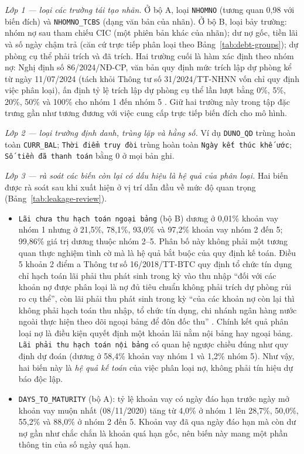 \noindent\textit{Lớp 1 --- loại các trường tái tạo nhãn.} Ở bộ A, loại \mbox{\texttt{NHOMNO}} (tương quan 0,98 với biến đích) và \mbox{\texttt{NHOMNO\_TCBS}} (dạng văn bản của nhãn). Ở bộ B, loại bảy trường: nhóm nợ sau tham chiếu CIC (một phiên bản khác của nhãn); dư nợ gốc, tiền lãi và số ngày chậm trả (căn cứ trực tiếp phân loại theo Bảng~\ref{tab:debt-groups}); dự phòng cụ thể phải trích và đã trích. Hai trường cuối là hàm xác định theo nhóm nợ: Nghị định số 86/2024/NĐ-CP, văn bản quy định mức trích lập dự phòng kể từ ngày 11/07/2024 (tách khỏi Thông tư số 31/2024/TT-NHNN vốn chỉ quy định việc phân loại), ấn định tỷ lệ trích lập dự phòng cụ thể lần lượt bằng 0\%, 5\%, 20\%, 50\% và 100\% cho nhóm 1 đến nhóm 5 \cite{gov2024nd86}. Giữ hai trường này trong tập đặc trưng gần như tương đương với việc cung cấp trực tiếp biến đích cho mô hình.

\noindent\textit{Lớp 2 --- loại trường định danh, trùng lặp và hằng số.} Ví dụ \mbox{\texttt{DUNO\_QD}} trùng hoàn toàn \mbox{\texttt{CURR\_BAL}}; \texttt{Thời điểm truy đòi} trùng hoàn toàn \texttt{Ngày kết thúc khế ước}; \texttt{Số tiền đã thanh toán} bằng 0 ở mọi bản ghi.

\noindent\textit{Lớp 3 --- rà soát các biến còn lại có dấu hiệu là hệ quả của phân loại.} Hai biến được rà soát sau khi xuất hiện ở vị trí dẫn đầu về mức độ quan trọng (Bảng~\ref{tab:leakage-review}).

\begin{itemize}
    \item \texttt{Lãi chưa thu hạch toán ngoại bảng} (bộ B) dương ở 0,01\% khoản vay nhóm 1 nhưng ở 21,5\%, 78,1\%, 93,0\% và 97,2\% khoản vay nhóm 2 đến 5; 99,86\% giá trị dương thuộc nhóm 2--5. Phân bố này không phải một tương quan thực nghiệm tình cờ mà là hệ quả bắt buộc của quy định kế toán. Điều 5 khoản 2 điểm a Thông tư số 16/2018/TT-BTC quy định tổ chức tín dụng chỉ hạch toán lãi phải thu phát sinh trong kỳ vào thu nhập ``đối với các khoản nợ được phân loại là nợ đủ tiêu chuẩn không phải trích dự phòng rủi ro cụ thể'', còn lãi phải thu phát sinh trong kỳ ``của các khoản nợ còn lại thì không phải hạch toán thu nhập, tổ chức tín dụng, chi nhánh ngân hàng nước ngoài thực hiện theo dõi ngoại bảng để đôn đốc thu'' \cite{btc2018tt16}. Chính kết quả phân loại nợ là điều kiện quyết định một khoản lãi nằm nội bảng hay ngoại bảng. \texttt{Lãi phải thu hạch toán nội bảng} có quan hệ ngược chiều đúng như quy định dự đoán (dương ở 58,4\% khoản vay nhóm 1 và 1,2\% nhóm 5). Như vậy, hai biến này là \emph{hệ quả kế toán} của việc phân loại nợ, không phải tín hiệu dự báo độc lập.
    \item \mbox{\texttt{DAYS\_TO\_MATURITY}} (bộ A): tỷ lệ khoản vay có ngày đáo hạn trước ngày mở khoản vay muộn nhất (08/11/2020) tăng từ 4,0\% ở nhóm 1 lên 28,7\%, 50,0\%, 55,2\% và 88,0\% ở nhóm 2 đến 5. Khoản vay đã qua ngày đáo hạn mà còn dư nợ gần như chắc chắn là khoản quá hạn gốc, nên biến này mang một phần thông tin của số ngày quá hạn.
\end{itemize}

